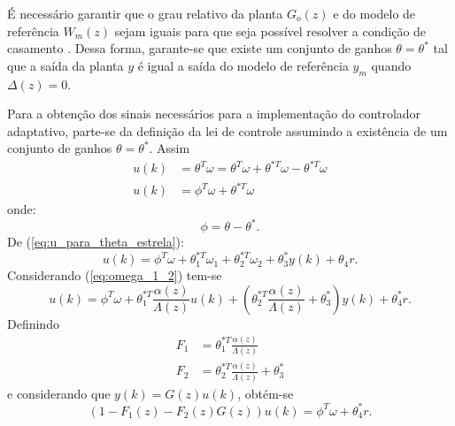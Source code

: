     É necessário garantir que o grau relativo da planta $G_o(z)$ e do modelo de referência
    $W_m(z)$ sejam iguais para que seja possível resolver a condição de casamento
    \cite{ref:IOANNOU}. Dessa forma, garante-se que existe um conjunto de ganhos
    $\theta = \theta^*$ tal que a saída da planta $y$ é igual a saída do modelo de referência
    $y_m$ quando $\Delta(z) = 0$.

    Para a obtenção dos sinais necessários para a implementação do controlador adaptativo,
    parte-se da definição da lei de controle assumindo a existência de um conjunto de ganhos
    $\theta = \theta^*$. Assim
    \begin{equation}
        \begin{split}
            u(k) &= \theta^T \omega = \theta^T \omega + \theta^{*T} \omega - \theta^{*T} \omega\\
            u(k) &= \phi^T \omega + \theta^{*T} \omega
            \label{eq:u_para_theta_estrela}
        \end{split}
    \end{equation}
    onde:
    \begin{equation*}
        \phi = \theta - \theta^* \text{.}
    \end{equation*}
    De (\ref{eq:u_para_theta_estrela}):
    \begin{equation*}
        u(k) = \phi^T \omega + \theta_1^{*T} \omega_1 + \theta_2^{*T} \omega_2 + \theta_3^* y(k)
            + \theta_4 r \text{.}
    \end{equation*}
    Considerando (\ref{eq:omega_1_2}) tem-se
    \begin{equation*}
        u(k) = \phi^T \omega + \theta_1^{*T} \frac{\alpha(z)}{\Lambda(z)} u(k) +
            \left( \theta_2^{*T} \frac{\alpha(z)}{\Lambda(z)} + \theta_3^* \right)
            y(k) + \theta_4^* r \text{.}
    \end{equation*}
    Definindo
    \begin{equation*}
        \begin{split}
            F_1 &= \theta_1^{*T} \frac{\alpha(z)}{\Lambda(z)}\\
            F_2 &= \theta_2^{*T} \frac{\alpha(z)}{\Lambda(z)} + \theta_3^*
        \end{split}
    \end{equation*}
    e considerando que $y(k) = G(z) u(k)$, obtém-se
    \begin{equation}
        \left( 1 - F_1(z) - F_2(z) G(z) \right) u(k) = \phi^T \omega + \theta_4^* r \text{.}
        \label{eq:funcao_de_fs}
    \end{equation}

